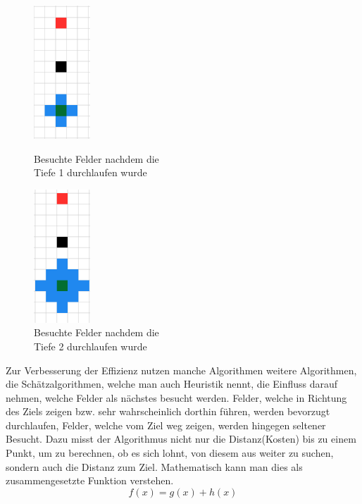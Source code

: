 {{{{			\begin{figure}[H]
				\begin{minipage}{0.5\textwidth}
					\centering
					\includegraphics[height=5cm]{Bilder/pathfinding_tiefe1.png}
					\caption{Besuchte Felder nachdem die \\ Tiefe 1 durchlaufen wurde} %
					\label{pic:pathtiefe1}
				\end{minipage}
				\begin{minipage}{0.5\textwidth}
					\centering
					\includegraphics[height=5cm]{Bilder/pathfinding_tiefe2.png}
					\caption{Besuchte Felder nachdem die \\ Tiefe 2 durchlaufen wurde} %
					\label{pic:pathtiefe2}
				\end{minipage}
			\end{figure}	
			
			Zur Verbesserung der Effizienz nutzen manche Algorithmen weitere Algorithmen, die Schätzalgorithmen, welche man auch Heuristik nennt, die Einfluss darauf nehmen, welche Felder als nächstes besucht werden. Felder, welche in Richtung des Ziels zeigen bzw. sehr wahrscheinlich dorthin führen, werden bevorzugt durchlaufen, Felder, welche vom Ziel weg zeigen, werden hingegen seltener Besucht. Dazu misst der Algorithmus nicht nur die Distanz(Kosten) bis zu einem Punkt, um zu berechnen, ob es sich lohnt, von diesem aus weiter zu suchen, sondern auch die Distanz zum Ziel. Mathematisch kann man dies als zusammengesetzte Funktion verstehen.
			\begin{equation}
				f(x) = g(x) + h(x)
			\end{equation}
			
}}}}
